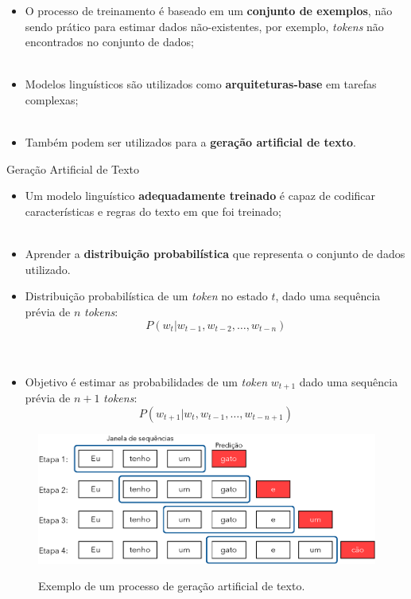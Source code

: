 \begin{frame}
	\begin{itemize}
		\justifying
		\item O processo de treinamento é baseado em um \textbf{conjunto de exemplos}, não sendo prático para estimar dados não-existentes, por exemplo, \emph{tokens} não encontrados no conjunto de dados;
		\\~\\
		\item Modelos linguísticos são utilizados como \textbf{arquiteturas-base} em tarefas complexas;
		\\~\\
		\item Também podem ser utilizados para a \textbf{geração artificial de texto}.
	\end{itemize}
\end{frame}

\begin{frame}{Geração Artificial de Texto}
	\begin{itemize}
		\justifying
		\item Um modelo linguístico \textbf{adequadamente treinado} é capaz de codificar características e regras do texto em que foi treinado;
		\\~\\
		\item Aprender a \textbf{distribuição probabilística} que representa o conjunto de dados utilizado.
	\end{itemize}
\end{frame}

\begin{frame}
	\begin{itemize}
		\justifying
		\item Distribuição probabilística de um \emph{token} no estado $t$, dado uma sequência prévia de $n$ \emph{tokens}:
		\begin{equation}
			P(w_t | w_{t-1}, w_{t-2}, \ldots, w_{t-n})	
		\end{equation}
		\\~\\
		\item Objetivo é estimar as probabilidades de um \emph{token} $w_{t+1}$ dado uma sequência prévia de $n+1$ \emph{tokens}:
		\begin{equation}
			P(w_{t+1} | w_{t}, w_{t-1}, \ldots, w_{t-n+1})	
		\end{equation}
	\end{itemize}
\end{frame}

\begin{frame}
	\begin{figure}[!ht]
		\centering
		\includegraphics[scale=0.425]{figs/text_generation.eps}	
		\label{f.text_generation}
		\caption{Exemplo de um processo de geração artificial de texto.}
	\end{figure}
\end{frame}